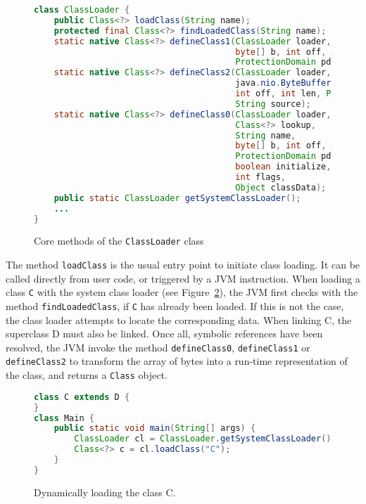 \begin{figure}[ht]
    \centering
\begin{lstlisting}[language=Java]
class ClassLoader {
    public Class<?> loadClass(String name);
    protected final Class<?> findLoadedClass(String name);
    static native Class<?> defineClass1(ClassLoader loader, String name, 
                                        byte[] b, int off, int len,
                                        ProtectionDomain pd, String source);
    static native Class<?> defineClass2(ClassLoader loader, String name, 
                                        java.nio.ByteBuffer b,
                                        int off, int len, ProtectionDomain pd,
                                        String source);
    static native Class<?> defineClass0(ClassLoader loader,
                                        Class<?> lookup,
                                        String name,
                                        byte[] b, int off, int len,
                                        ProtectionDomain pd,
                                        boolean initialize,
                                        int flags,
                                        Object classData);
    public static ClassLoader getSystemClassLoader();
    ...
}
\end{lstlisting}
    \caption{Core methods of the \texttt{ClassLoader} class}
    \label{fig:classloader}
\end{figure}


The method \verb|loadClass| is the usual entry point to initiate class loading. It can be called directly from user code, or triggered by a JVM instruction.
When loading a class \verb|C| with the system class loader (see Figure~\ref{fig:class_C}), the JVM first checks with the method \verb|findLoadedClass|, if \verb|C| has already been loaded. If this is not the case, the class loader attempts to locate the corresponding data. When linking C, the superclass D must also be linked. Once all, symbolic references have been resolved, the JVM invoke the method \verb|defineClass0|, \verb|defineClass1| or \verb|defineClass2| to transform the array of bytes into a run-time representation of the class, and returns a \verb|Class| object.

\begin{figure}[h]
    \centering
\begin{lstlisting}[language=Java]
class C extends D {
}
class Main {
    public static void main(String[] args) {
        ClassLoader cl = ClassLoader.getSystemClassLoader();
        Class<?> c = cl.loadClass("C");
    }
}
\end{lstlisting}
    \caption{Dynamically loading the class C.}
    \label{fig:class_C}
\end{figure}

